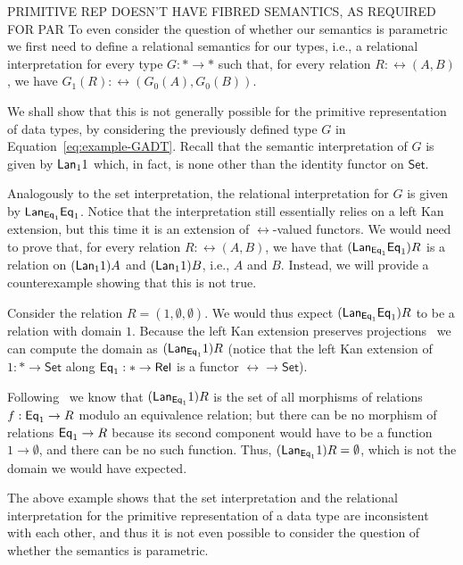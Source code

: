 \documentclass[acmsmall,screen,review,anonymous]{acmart}
\theoremstyle{definition}
\newcommand{\set}{\mathsf{Set}}
\begin{document}
\begin{example}
{\color{red} PRIMITIVE REP DOESN'T HAVE FIBRED SEMANTICS, AS REQUIRED
  FOR PAR} To
even consider the question of whether our semantics is parametric we
first need to define a relational semantics for our types, i.e., a
relational interpretation for every type $G : \ast \to \ast$ such
that, for every relation $R : \rel(A, B)$, we have $G_1(R) :
\rel(G_0(A), G_0(B))$.

We shall show that this is not generally possible for the primitive
representation of data types, by considering the previously defined
type $G$ in Equation~\ref{eq:example-GADT}.  Recall that the semantic
interpretation of $G$ is given by $\mathsf{\mathsf{Lan}}_1 1$ which, in fact,
is none other than the identity functor on $\set$.

Analogously to the set interpretation, the relational interpretation
for $G$ is given by $\mathsf{\mathsf{Lan}}_{\mathsf{Eq}_1} \mathsf{Eq}_1$.  Notice that the
interpretation still essentially relies on a left Kan extension, but
this time it is an extension of $\rel$-valued functors.  We would need
to prove that, for every relation $R : \rel(A, B)$, we have that
$(\mathsf{\mathsf{Lan}}_{\mathsf{Eq}_1} \mathsf{Eq}_1) R$ is a relation on $(\mathsf{\mathsf{Lan}}_1
1) A$ and $(\mathsf{\mathsf{Lan}}_1 1)B$, i.e., $A$ and $B$.  Instead, we will
provide a counterexample showing that this is not true.

Consider the relation $R = (1, \emptyset, \emptyset)$.  We would thus
expect $(\mathsf{\mathsf{Lan}}_{\mathsf{Eq}_1} \mathsf{Eq}_1) R$ to be a relation with domain
$1$.  Because the left Kan extension preserves
projections~\cite{rie16} we can compute the domain as
$(\mathsf{\mathsf{Lan}}_{\mathsf{Eq}_1} 1) R$ (notice that the left Kan extension of
$1 : \ast \to \set$ along $\mathsf{Eq}_1 : \ast \to \mathsf{Rel}$ is a functor $\rel
\to \set$).

Following~\cite{blw03} we know that $(\mathsf{\mathsf{Lan}}_{\mathsf{Eq}_1} 1) R$ is
the set of all morphisms of relations $f : \mathsf{Eq}_1 \to R$ modulo an
equivalence relation; but there can be no morphism of relations $\mathsf{Eq}_1
\to R$ because its second component would have to be a function $1 \to
\emptyset$, and there can be no such function.  Thus,
$(\mathsf{\mathsf{Lan}}_{\mathsf{Eq}_1} 1) R = \emptyset$, which is not the domain we
would have expected.
\end{example}

The above example shows that the set interpretation and the relational
interpretation for the primitive representation of a data type are
inconsistent with each other, and thus it is not even possible to
consider the question of whether the semantics is parametric.
\end{document}

